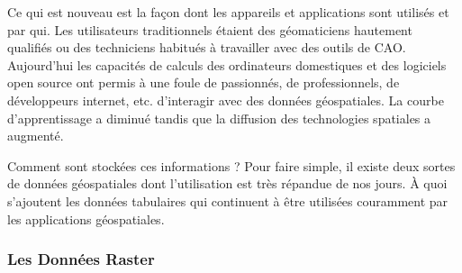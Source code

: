 Ce qui est nouveau est la façon dont les appareils et applications sont utilisés et par qui. Les utilisateurs traditionnels étaient des géomaticiens hautement qualifiés ou des techniciens habitués à travailler avec des outils de CAO. Aujourd'hui les capacités de calculs des ordinateurs domestiques et des logiciels open source ont permis à une foule de passionnés, de professionnels, de développeurs internet, etc. d'interagir avec des données géospatiales. La courbe d'apprentissage a diminué tandis que la diffusion des technologies spatiales a augmenté.

Comment sont stockées ces informations ? Pour faire simple, il existe deux sortes de données géospatiales dont l'utilisation est très répandue de nos jours. À quoi s'ajoutent les données tabulaires qui continuent à être utilisées couramment par les applications géospatiales.

%
%
%

\subsubsection{Les Données Raster}\label{label_rasterdata}

